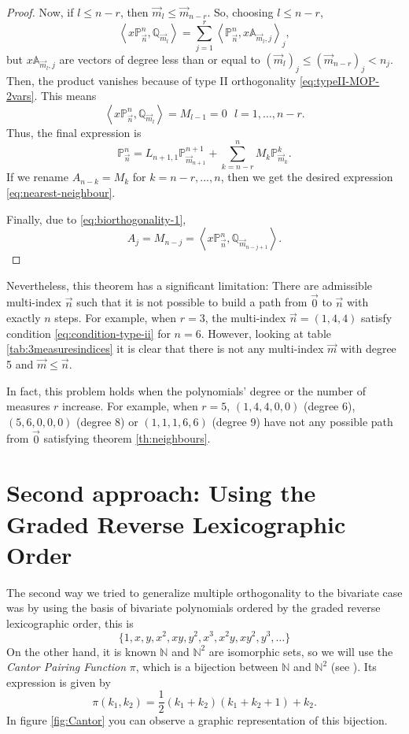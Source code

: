 \documentclass[12pt,a4]{report}
\theoremstyle{plain}
\newcommand{\N}[0]{\mathbb{N}}
\newcommand{\prodesc}[2]{\left\langle #1 , #2 \right\rangle}
\begin{document}
\begin{proof}
    Now, if $l\leq n-r$, then $\overrightarrow{m}_l\leq \overrightarrow{m}_{n-r}$. So, choosing $l\leq n-r$,
    $$
    \prodesc{x\mathbb P_{\vec n}^n}{\mathbb Q_{\overrightarrow{m}_l}} = \sum_{j=1}^r  \prodesc{\mathbb P_{\vec n}^n}{x\mathbb A_{\overrightarrow{m}_l,j}}_j,
    $$
    but $x\mathbb A_{\overrightarrow{m}_l,j}$ are vectors of degree less than or equal to $(\overrightarrow{m}_l)_j\leq (\overrightarrow{m}_{n-r})_j < n_j$. Then, the product vanishes because of type II orthogonality \eqref{eq:typeII-MOP-2vars}. This means
    $$
    \prodesc{x\mathbb P_{\vec n}^n}{\mathbb Q_{\overrightarrow{m}_l}} = M_{l-1} = 0 \ \ \ l = 1, \dots, n-r.
    $$
    Thus, the final expression is
    $$
    \mathbb P_{\overrightarrow{n}}^n = L_{n+1,1}\mathbb P_{\overrightarrow{m}_{n+1}}^{n+1} + \sum_{k=n-r}^{n} M_k \mathbb P_{\overrightarrow{m}_k}^k.
    $$
    If we rename $A_{n-k} = M_k$ for $k=n-r,...,n$, then we get the desired expression \eqref{eq:nearest-neighbour}. 

    Finally, due to \eqref{eq:biorthogonality-1}, $$A_j = M_{n-j} =  \prodesc{x\mathbb P_{\vec n}^n}{\mathbb Q_{\overrightarrow{m}_{n-j+1}}}.$$
\end{proof}

Nevertheless, this theorem has a significant limitation: There are admissible multi-index $\vec n$ such that it is not possible to build a path from $\vec 0$ to $\vec n$ with exactly $n$ steps. For example, when $r=3$, the multi-index $\vec n =(1,4,4)$ satisfy condition \eqref{eq:condition-type-ii} for $n=6$. However, looking at table \ref{tab:3measuresindices} it is clear that there is not any multi-index $\vec m$ with degree 5 and $\vec m \leq \vec n$. 

In fact, this problem holds when the polynomials' degree or the number of measures $r$ increase. For example, when $r=5$, $(1,4,4,0,0)$ (degree 6), $(5,6,0,0,0)$ (degree 8) or $(1,1,1,6,6)$ (degree 9) have not any possible path from $\vec 0$ satisfying theorem \ref{th:neighbours}.


\chapter{Second approach: Using the Graded Reverse Lexicographic Order}
\label{chap:II}

The second way we tried to generalize multiple orthogonality to the bivariate case was by using the basis of bivariate polynomials ordered by the graded reverse lexicographic order, this is
\begin{equation}
    \label{eq:usual-basis-ordered}
    \{1,x,y,x^2,xy,y^2,x^3,x^2y,xy^2,y^3,\dots\}
\end{equation}
On the other hand, it is known $\N$ and $\N^2$ are isomorphic sets, so we will use the \emph{Cantor Pairing Function} $\pi$, which is a bijection between $\N$ and $\N^2$ (see \cite{Lisi}). Its expression is given by 
$$
\pi(k_1, k_2) = \dfrac{1}{2}(k_1 + k_2)(k_1 + k_2 + 1) + k_2.
$$
In figure  \ref{fig:Cantor} you can observe a graphic representation of this bijection.
\end{document}
